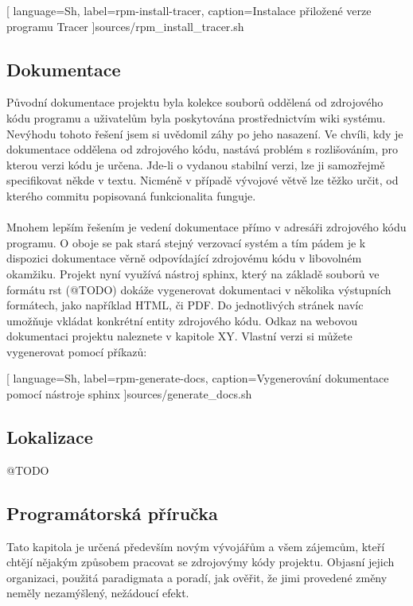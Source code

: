 \documentclass[
  field=inf,
  biblatex,
  glossaries,
  index
]{kidiplom}
\begin{document}
	
	[
		language=Sh,
		label=rpm-install-tracer,
		caption={Instalace přiložené verze programu Tracer}
	]{sources/rpm_install_tracer.sh}

	\subsection{Dokumentace}
	Původní dokumentace projektu byla kolekce souborů oddělená od zdrojového kódu programu a uživatelům byla poskytována prostřednictvím wiki systému. Nevýhodu tohoto řešení jsem si uvědomil záhy po jeho nasazení. Ve chvíli, kdy je dokumentace oddělena od zdrojového kódu, nastává problém s rozlišováním, pro kterou verzi kódu je určena. Jde-li o vydanou stabilní verzi, lze ji samozřejmě specifikovat někde v textu. Nicméně v případě vývojové větvě lze těžko určit, od kterého commitu popisovaná funkcionalita funguje.
	\\
	\\
	Mnohem lepším řešením je vedení dokumentace přímo v adresáři zdrojového kódu programu. O oboje se pak stará stejný verzovací systém a tím pádem je k dispozici dokumentace věrně odpovídající zdrojovému kódu v libovolném okamžiku. Projekt nyní využívá nástroj sphinx, který na základě souborů ve formátu rst (@TODO) dokáže vygenerovat dokumentaci v několika výstupních formátech, jako například HTML, či PDF. Do jednotlivých stránek navíc umožňuje vkládat konkrétní entity zdrojového kódu. Odkaz na webovou dokumentaci projektu naleznete v kapitole XY. Vlastní verzi si můžete vygenerovat pomocí příkazů:

	
	[
		language=Sh,
		label=rpm-generate-docs,
		caption={Vygenerování dokumentace pomocí nástroje sphinx}
	]{sources/generate_docs.sh}

	\subsection{Lokalizace}
	@TODO

	\subsection{Programátorská příručka}
	Tato kapitola je určená především novým vývojářům a všem zájemcům, kteří chtějí nějakým způsobem pracovat se zdrojovýmy kódy projektu. Objasní jejich organizaci, použitá paradigmata a poradí, jak ověřit, že jimi provedené změny neměly nezamýšlený, nežádoucí efekt.
\end{document}
